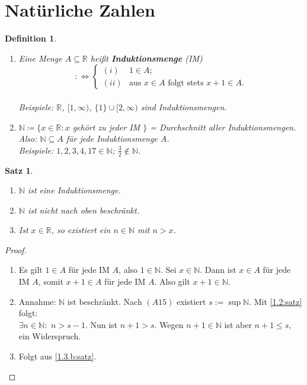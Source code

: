 \documentclass[12pt]{extreport} %
\newcommand{\N}{\mathbb{N}}
\newcommand{\R}{\mathbb{R}}
\theoremstyle{named}
\theoremstyle{itshape}
\newtheorem{satz}[unnamedtheorem]{Satz}
\newtheorem*{definition}{Definition}
\theoremstyle{normal}
\begin{document}
\section*{Natürliche Zahlen} 

 
\begin{definition} ~\
	\begin{enumerate}
		\item Eine Menge $A \subseteq \R$ hei{\ss}t \textbf{Induktionsmenge} (IM)
		$$ :\iff \begin{cases}(i) & 1 \in A; \\ (ii) & \text{aus } x \in A \text{ folgt stets } x + 1 \in A. \end{cases}$$ \\
		Beispiele: $\R$, $[1, \infty)$, $\{ 1 \} \cup [2, \infty)$ sind Induktionsmengen. 
		\item $\N \coloneqq \{ x \in \R : x$ gehört zu jeder IM $\}$ = Durchschnitt aller Induktionsmengen. \\
			Also: $\N \subseteq A$ für jede Induktionsmenge $A$. \\
			Beispiele: $1,2,3,4,17 \in \N$; $\frac{3}{2} \notin \N$.
	\end{enumerate}	
\end{definition}

\begin{satz} ~\ \label{1.3:satz}
	\begin{enumerate}
		\item $\N$ ist eine Induktionsmenge.
		\item $\N$ ist nicht nach oben beschränkt.\label{1.3.b:satz}
		\item Ist $x \in \R$, so existiert ein $n \in \N$ mit $n > x$. \label{1.3.c:satz}
	\end{enumerate}
\end{satz}

\begin{proof} ~\
	\begin{enumerate}
	        \item Es gilt $1 \in A$ für jede IM $A$, also $1 \in \N$. Sei $x \in \N$. Dann ist $x \in A$ für jede IM $A$, somit
	               $x+1 \in A$ für jede IM $A$. Also gilt $x+1 \in \N$.
	        \item Annahme: $\N$ ist beschränkt. Nach $(A15)$ existiert $s:=\sup \N$. Mit \ref{1.2:satz} folgt:\\
	               $\exists n \in \N:$ $n>s-1$. Nun ist $n+1 > s$. Wegen $n+1 \in \N$ ist aber $n+1 \le s$, ein Widerspruch.
	        \item Folgt aus \ref{1.3.b:satz}.
	\end{enumerate}
\end{proof}
\end{document}
